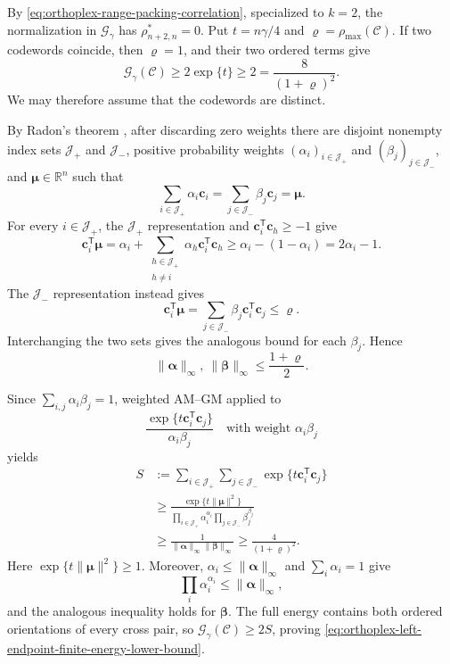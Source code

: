 \documentclass[12pt,draftclsnofoot,onecolumn]{IEEEtran}
\newcommand{\R}{\mathbb{R}}
\newcommand{\cC}{\mathcal{C}}
\newcommand{\cG}{\mathcal{G}}
\newcommand{\bc}{\bm c}
\newcommand{\T}{\mathsf T}
\theoremstyle{definition}
\begin{document}
\begin{IEEEproof}
By \eqref{eq:orthoplex-range-packing-correlation}, specialized to
\(k=2\), the normalization in
\(\cG_\gamma\) has \(\rho^{\ast}_{n+2,n}=0\).  Put
\(t=n\gamma/4\) and \(\varrho=\rho_{\max}(\cC)\).  If two codewords
coincide, then \(\varrho=1\), and their two ordered terms give
\[
  \cG_\gamma(\cC)\ge2\exp\{t\}
  \ge2=\frac{8}{(1+\varrho)^2}.
\]
We may therefore assume that the codewords are distinct.

By Radon's theorem \cite{Radon1921}, after discarding zero weights there
are disjoint nonempty index sets \(\mathcal J_+\) and
\(\mathcal J_-\), positive probability weights
\((\alpha_i)_{i\in\mathcal J_+}\) and
\((\beta_j)_{j\in\mathcal J_-}\), and \(\bm\mu\in\R^n\) such that
\[
  \sum_{i\in\mathcal J_+}\alpha_i\bc_i
  =\sum_{j\in\mathcal J_-}\beta_j\bc_j
  =\bm\mu.
\]
For every \(i\in\mathcal J_+\), the \(\mathcal J_+\) representation and
\(\bc_i^{\mathsf T}\bc_h\ge-1\) give
\begin{equation*}
  \bc_i^{\mathsf T}\bm\mu
  =\alpha_i+
  \sum_{\substack{h\in\mathcal J_+\\h\ne i}}
  \alpha_h\bc_i^{\mathsf T}\bc_h
  \ge\alpha_i-(1-\alpha_i)
  =2\alpha_i-1.
\end{equation*}
The \(\mathcal J_-\) representation instead gives
\begin{equation*}
  \bc_i^{\mathsf T}\bm\mu
  =\sum_{j\in\mathcal J_-}\beta_j
  \bc_i^{\mathsf T}\bc_j
  \le\varrho.
\end{equation*}
Interchanging the two sets gives the analogous bound for each
\(\beta_j\).  Hence
\[
  \|\bm\alpha\|_\infty,\ \|\bm\beta\|_\infty
  \le\frac{1+\varrho}{2}.
\]

Since \(\sum_{i,j}\alpha_i\beta_j=1\), weighted AM--GM applied to
\begin{equation*}
  \frac{\exp\{t\bc_i^{\mathsf T}\bc_j\}}
  {\alpha_i\beta_j}
  \quad\text{with weight }\alpha_i\beta_j
\end{equation*}
yields
\begin{align*}
  S
  &:={}
  \sum_{i\in\mathcal J_+}\sum_{j\in\mathcal J_-}
  \exp\{t\bc_i^\T\bc_j\}\\
  &\ge
  \frac{\exp\{t\|\bm\mu\|^2\}}
  {\displaystyle
   \prod_{i\in\mathcal J_+}\alpha_i^{\alpha_i}
   \prod_{j\in\mathcal J_-}\beta_j^{\beta_j}}\\
  &\ge
  \frac{1}{\|\bm\alpha\|_\infty\|\bm\beta\|_\infty}
  \ge\frac{4}{(1+\varrho)^2}.
\end{align*}
Here \(\exp\{t\|\bm\mu\|^2\}\ge1\).  Moreover,
\(\alpha_i\le\|\bm\alpha\|_\infty\) and
\(\sum_i\alpha_i=1\) give
\begin{equation*}
  \prod_i\alpha_i^{\alpha_i}
  \le\|\bm\alpha\|_\infty,
\end{equation*}
and the analogous inequality holds for \(\bm\beta\).
The full energy contains both ordered orientations of every cross pair,
so \(\cG_\gamma(\cC)\ge2S\), proving
\eqref{eq:orthoplex-left-endpoint-finite-energy-lower-bound}.


\end{IEEEproof}
\end{document}
